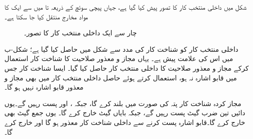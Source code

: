 شکل     میں داخلی منتخب کار کا تصور   پیش کیا گیا  ہے،  جہاں  پیچی سوئچ کے ذریعہ   تا  میں سے ایک کا   مواد   مخارج   منتقل کیا جا سکتا ہے۔
\begin{figure}
\centering
{}
\caption{چار سے ایک داخلی  منتخب کار کا تصور۔}
\label{شکل_ترکیبی_چار_سے_ایک_داخلی_منتخب_کار_تصور}
\end{figure}

داخلی منتخب کار کو شناخت کار کی مدد سے شکل  میں حاصل کیا گیا ہے؛ شکل-ب میں اس کی علامت پیش  ہے۔ یہاں مجاز و  معذور  صلاحیت  کا شناخت کار استعمال کرکے مجاز و معذور صلاحیت کا داخلی  منتخب کار حاصل کیا گیا۔   ایسا شناخت کار جس میں قابو اشارہ نہ ہو، استعمال کرتے ہوئے حاصل داخلی منتخب کار میں بھی مجاز و معذور  قابو اشارہ نہیں ہو گا۔

مجاز کردہ شناخت کار   پتہ کی صورت میں   بلند کرے گا،  جبکہ ،  اور    پست رہیں گے۔یوں دائیں  تین ضرب گیٹ  پست رہیں گے،  جبکہ بایاں   گیٹ   خارج  کرے گا۔ یوں  جمع گیٹ  بھی   خارج کرے گا۔قابو اشارہ  پست کرنے سے داخلی شناخت کار معذور  ہو گا اور  خارج کرے گا۔


